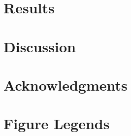 \section{Results}


\section{Discussion}


%

\section{Acknowledgments}




\pagebreak
\section{Figure Legends}


\FloatBarrier

%
%
%
%

